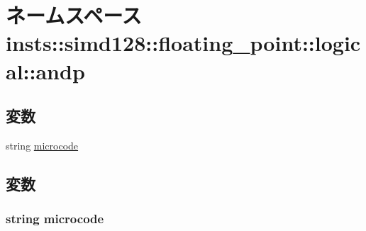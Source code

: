 \hypertarget{namespaceinsts_1_1simd128_1_1floating__point_1_1logical_1_1andp}{
\section{ネームスペース insts::simd128::floating\_\-point::logical::andp}
\label{namespaceinsts_1_1simd128_1_1floating__point_1_1logical_1_1andp}
}
\subsection*{変数}
\begin{DoxyCompactItemize}
\item 
string \hyperlink{namespaceinsts_1_1simd128_1_1floating__point_1_1logical_1_1andp_a770f11a173e99389a8802f0107ed8f52}{microcode}
\end{DoxyCompactItemize}


\subsection{変数}
\hypertarget{namespaceinsts_1_1simd128_1_1floating__point_1_1logical_1_1andp_a770f11a173e99389a8802f0107ed8f52}{
\subsubsection[{microcode}]{\setlength{\rightskip}{0pt plus 5cm}string {\bf microcode}}}
\label{namespaceinsts_1_1simd128_1_1floating__point_1_1logical_1_1andp_a770f11a173e99389a8802f0107ed8f52}
